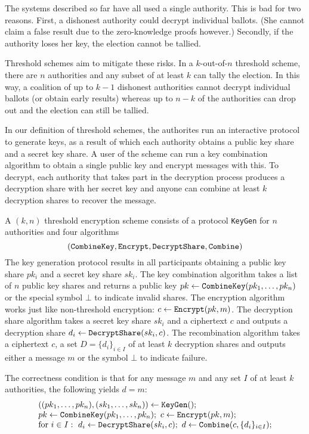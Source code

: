 \documentclass{llncs}
\newcommand{\alg}[1]{\textup{\texttt{#1}}}
\begin{document}
The systems described so far have all used a single authority. This is bad for
two reasons. First, a dishonest authority could decrypt individual ballots. (She
cannot claim a false result due to the zero-knowledge proofs however.) Secondly,
if the authority loses her key, the election cannot be tallied.

Threshold schemes aim to mitigate these risks. In a $k$-out-of-$n$ threshold
scheme, there are $n$ authorities and any subset of at least $k$ can tally the
election. In this way, a coalition of up to $k - 1$ dishonest authorities cannot
decrypt individual ballots (or obtain early results) whereas up to $n - k$ of
the authorities can drop out and the election can still be tallied.

In our definition of threshold schemes, the authorites run an interactive
protocol to generate keys, as a result of which each authority obtains a public key share and a secret key share. A user of the scheme can run a key combination algorithm to obtain a single public key and encrypt messages with this. To decrypt, each authority that takes part in the decryption process produces a decryption share with her secret key and anyone can combine at least $k$ decryption shares to recover the message.

\begin{definition}
A $(k, n)$ threshold encryption scheme consists of a protocol \alg{KeyGen} for $n$ authorities and four algorithms
\[
\left(\alg{CombineKey}, \alg{Encrypt}, \alg{DecryptShare}, \alg{Combine}\right)
\]
The key generation protocol results in all participants obtaining a public key
share $pk_i$ and a secret key share $sk_i$. The key combination algorithm takes
a list of $n$ public key shares and returns a public key $pk \gets
\alg{CombineKey}(pk_1, \ldots, pk_n)$ or the special symbol $\bot$ to indicate
invalid shares. The encryption algorithm works just like non-threshold
encryption: $c \gets \alg{Encrypt}(pk, m)$. The decryption share algorithm takes
a secret key share $sk_i$ and a ciphertext $c$ and outputs a decryption share
$d_i \gets \alg{DecryptShare}(sk_i, c)$. The recombination algorithm takes a
ciphertext $c$, a set $D = \{d_i\}_{i \in I}$ of at least $k$ decryption shares
and outputs either a message $m$ or the symbol $\bot$ to indicate failure.

The correctness condition is that for any message $m$ and any set $I$ of at
least $k$ authorities, the following yields $d = m$:
\[ \begin{array}{l}
((pk_1, \ldots, pk_n), (sk_1, \ldots, sk_n)) \gets \alg{KeyGen}(); \\
pk \gets \alg{CombineKey}(pk_1, \ldots, pk_n);\ 
c \gets \alg{Encrypt}(pk, m); \\
\textrm{for } i \in I:\ d_i \gets \alg{DecryptShare}(sk_i, c);\ 
d \gets \alg{Combine}(c, \{d_i\}_{i \in I});
\end{array} \]
\end{definition}
\end{document}

